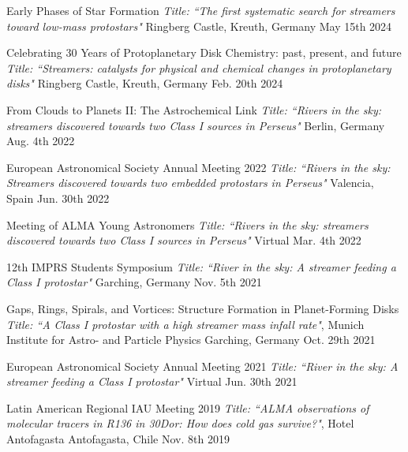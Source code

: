 \begin{cvhonors}
	\cvhonor
	{Early Phases of Star Formation} %
	{\textit{Title: ``The first systematic search for streamers toward low-mass protostars"}} %
	{Ringberg Castle, Kreuth, Germany} %
	{May 15th 2024} %

	\cvhonor
	{Celebrating 30 Years of Protoplanetary Disk Chemistry: past, present, and future} %
	{\textit{Title: ``Streamers: catalysts for physical and chemical changes in protoplanetary disks"}} %
	{Ringberg Castle, Kreuth, Germany} %
	{Feb. 20th 2024} %

	 \cvhonor
	{From Clouds to Planets II: The Astrochemical Link} %
	{\textit{Title: ``Rivers in the sky: streamers discovered towards two Class I sources in Perseus"}} %
	{Berlin, Germany} %
	{Aug. 4th 2022} %


	\cvhonor
	{European Astronomical Society Annual Meeting 2022} %
	{\textit{Title: ``Rivers in the sky: Streamers discovered towards two embedded protostars in Perseus"}} %
	{Valencia, Spain} %
	{Jun. 30th 2022} %

  \cvhonor
    {Meeting of ALMA Young Astronomers} %
    {\textit{Title: ``Rivers in the sky: streamers discovered towards two Class I sources in Perseus"}} %
    { Virtual} %
    {Mar. 4th 2022} %

 
  \cvhonor
    {12th IMPRS Students Symposium} %
    {\textit{Title: ``River in the sky: A streamer feeding a Class I protostar"}}%
    {Garching, Germany} %
    {Nov. 5th 2021} %

  \cvhonor
    {Gaps, Rings, Spirals, and Vortices: Structure Formation in Planet-Forming Disks} %
    {\textit{Title: ``A Class I protostar with a high streamer mass infall rate"}, Munich Institute for Astro- and Particle Physics} %
    {Garching, Germany} %
    {Oct. 29th 2021} %

  \cvhonor
    {European Astronomical Society Annual Meeting 2021} %
    {\textit{Title: ``River in the sky: A streamer feeding a Class I protostar"}} %
    {Virtual} %
    {Jun. 30th 2021} %

  \cvhonor
    {Latin American Regional IAU Meeting 2019} %
    {\textit{Title: ``ALMA observations of molecular tracers in R136 in 30Dor: How does cold gas survive?"}, Hotel Antofagasta} %
    {Antofagasta, Chile} %
    {Nov. 8th 2019} %

\end{cvhonors}

